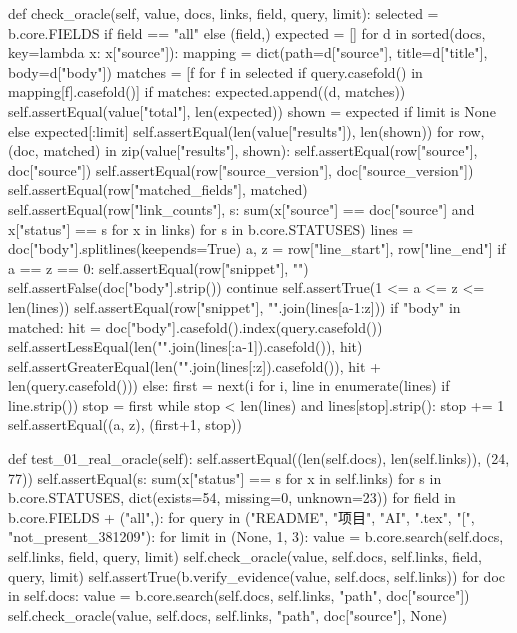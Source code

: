     def check_oracle(self, value, docs, links, field, query, limit):
        selected = b.core.FIELDS if field == "all" else (field,)
        expected = []
        for d in sorted(docs, key=lambda x: x["source"]):
            mapping = dict(path=d["source"], title=d["title"], body=d["body"])
            matches = [f for f in selected if query.casefold() in mapping[f].casefold()]
            if matches:
                expected.append((d, matches))
        self.assertEqual(value["total"], len(expected))
        shown = expected if limit is None else expected[:limit]
        self.assertEqual(len(value["results"]), len(shown))
        for row, (doc, matched) in zip(value["results"], shown):
            self.assertEqual(row["source"], doc["source"])
            self.assertEqual(row["source_version"], doc["source_version"])
            self.assertEqual(row["matched_fields"], matched)
            self.assertEqual(row["link_counts"],
                             {s: sum(x["source"] == doc["source"] and x["status"] == s for x in links)
                              for s in b.core.STATUSES})
            lines = doc["body"].splitlines(keepends=True)
            a, z = row["line_start"], row["line_end"]
            if a == z == 0:
                self.assertEqual(row["snippet"], "")
                self.assertFalse(doc["body"].strip())
                continue
            self.assertTrue(1 <= a <= z <= len(lines))
            self.assertEqual(row["snippet"], "".join(lines[a-1:z]))
            if "body" in matched:
                hit = doc["body"].casefold().index(query.casefold())
                self.assertLessEqual(len("".join(lines[:a-1]).casefold()), hit)
                self.assertGreaterEqual(len("".join(lines[:z]).casefold()), hit + len(query.casefold()))
            else:
                first = next(i for i, line in enumerate(lines) if line.strip())
                stop = first
                while stop < len(lines) and lines[stop].strip():
                    stop += 1
                self.assertEqual((a, z), (first+1, stop))

    def test_01_real_oracle(self):
        self.assertEqual((len(self.docs), len(self.links)), (24, 77))
        self.assertEqual({s: sum(x["status"] == s for x in self.links) for s in b.core.STATUSES},
                         dict(exists=54, missing=0, unknown=23))
        for field in b.core.FIELDS + ("all",):
            for query in ("README", "项目", "AI", ".tex", "[", "not_present_381209"):
                for limit in (None, 1, 3):
                    value = b.core.search(self.docs, self.links, field, query, limit)
                    self.check_oracle(value, self.docs, self.links, field, query, limit)
                    self.assertTrue(b.verify_evidence(value, self.docs, self.links))
        for doc in self.docs:
            value = b.core.search(self.docs, self.links, "path", doc["source"])
            self.check_oracle(value, self.docs, self.links, "path", doc["source"], None)

